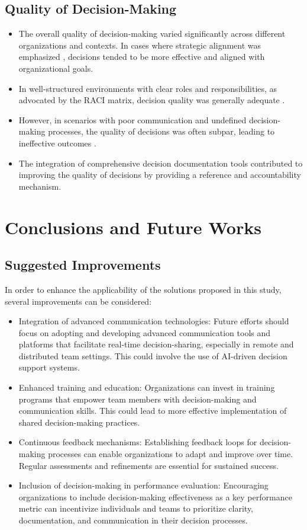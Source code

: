 \documentclass[12pt]{article}
\begin{document}
\subsection{Quality of Decision-Making}
\begin{itemize}
  \item The overall quality of decision-making varied significantly across different organizations and contexts. In cases where strategic alignment was emphasized \cite{reference10}, decisions tended to be more effective and aligned with organizational goals.
  \item In well-structured environments with clear roles and responsibilities, as advocated by the RACI matrix, decision quality was generally adequate \cite{reference8}.
  \item However, in scenarios with poor communication and undefined decision-making processes, the quality of decisions was often subpar, leading to ineffective outcomes \cite{reference5}.
  \item The integration of comprehensive decision documentation tools \cite{reference7} contributed to improving the quality of decisions by providing a reference and accountability mechanism.
\end{itemize}

\newpage
\section{Conclusions and Future Works}

\subsection{Suggested Improvements}
In order to enhance the applicability of the solutions proposed in this study, several improvements can be considered:
\begin{itemize}
  \item Integration of advanced communication technologies: Future efforts should focus on adopting and developing advanced communication tools and platforms that facilitate real-time decision-sharing, especially in remote and distributed team settings. This could involve the use of AI-driven decision support systems.
  \item Enhanced training and education: Organizations can invest in training programs that empower team members with decision-making and communication skills. This could lead to more effective implementation of shared decision-making practices.
  \item Continuous feedback mechanisms: Establishing feedback loops for decision-making processes can enable organizations to adapt and improve over time. Regular assessments and refinements are essential for sustained success.
  \item Inclusion of decision-making in performance evaluation: Encouraging organizations to include decision-making effectiveness as a key performance metric can incentivize individuals and teams to prioritize clarity, documentation, and communication in their decision processes.
\end{itemize}
\end{document}
